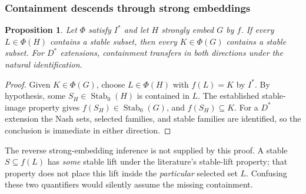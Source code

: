 \documentclass[11pt]{article}
\newtheorem{proposition}[theorem]{Proposition}
\theoremstyle{definition}
\newcommand{\Stab}{\operatorname{Stab}_0}
\begin{document}
\subsubsection{Containment descends through strong embeddings}
\begin{proposition}\label{prop:descent}
Let $\Phi$ satisfy $I^*$ and let $H$ strongly embed $G$ by $f$. If every
$L\in\Phi(H)$ contains a stable subset, then every $K\in\Phi(G)$ contains a
stable subset. For $D^*$ extensions, containment transfers in both directions
under the natural identification.
\end{proposition}
\begin{proof}
Given $K\in\Phi(G)$, choose $L\in\Phi(H)$ with $f(L)=K$ by $I^*$.
By hypothesis, some $S_H\in\Stab(H)$ is contained in $L$. The established
stable-image property gives $f(S_H)\in\Stab(G)$, and $f(S_H)\subseteq K$.
For a $D^*$ extension the Nash sets, selected families, and stable families
are identified, so the conclusion is immediate in either direction.
\end{proof}

The reverse strong-embedding inference is not supplied by this proof.
A stable $S\subseteq f(L)$ has \emph{some} stable lift under the literature's
stable-lift property; that property does not place this lift inside the
\emph{particular} selected set $L$. Confusing these two quantifiers would
silently assume the missing containment.
\end{document}
